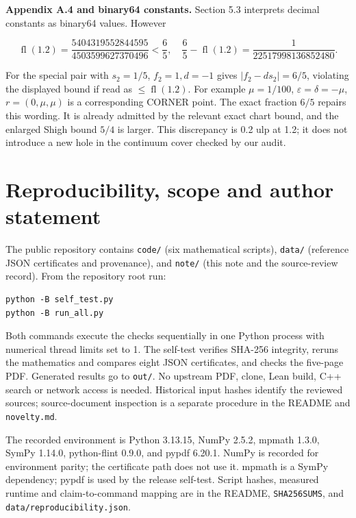\documentclass[
  10pt,
  a4paper,
]{article}
\begin{document}
\textbf{Appendix A.4 and binary64 constants.} Section 5.3 interprets
decimal constants as binary64 values. However

\[\operatorname{fl}(1.2)=\frac{5404319552844595}{4503599627370496}<\frac65,
\quad \frac65-\operatorname{fl}(1.2)=\frac1{22517998136852480}.\]

For the special pair with \(s_2=1/5\), \(f_2=1,d=-1\) gives
\(|f_2-ds_2|=6/5\), violating the displayed bound if read as
\(\leq\operatorname{fl}(1.2)\). For example \(\mu=1/100\),
\(\varepsilon=\delta=-\mu\), \(r=(0,\mu,\mu)\) is a corresponding CORNER
point. The exact fraction \(6/5\) repairs this wording. It is already
admitted by the relevant exact chart bound, and the enlarged Shigh bound
\(5/4\) is larger. This discrepancy is 0.2 ulp at 1.2; it does not
introduce a new hole in the continuum cover checked by our audit.

\newpage

\section{Reproducibility, scope and author statement}
\label{reproducibility-scope-and-author-statement}

The public repository contains \texttt{code/} (six mathematical scripts),
\texttt{data/} (reference JSON certificates and provenance), and
\texttt{note/} (this note and the source-review record).
From the repository root run:
\begin{verbatim}
python -B self_test.py
python -B run_all.py
\end{verbatim}
Both commands execute the checks sequentially in one Python process with
numerical thread limits set to 1. The self-test verifies SHA-256 integrity,
reruns the mathematics and compares eight JSON certificates, and checks the
five-page PDF. Generated results go to \texttt{out/}. No upstream PDF,
clone, Lean build, C++ search or network access is needed. Historical input
hashes identify the reviewed sources; source-document inspection is a
separate procedure in the README and \texttt{novelty.md}.

The recorded environment is Python 3.13.15, NumPy 2.5.2, mpmath 1.3.0,
SymPy 1.14.0, python-flint 0.9.0, and pypdf 6.20.1. NumPy is recorded for
environment parity; the certificate path does not use it. mpmath is a
SymPy dependency; pypdf is used by the release self-test. Script hashes,
measured runtime and claim-to-command mapping are in the README,
\texttt{SHA256SUMS}, and \texttt{data/reproducibility.json}.
\end{document}
